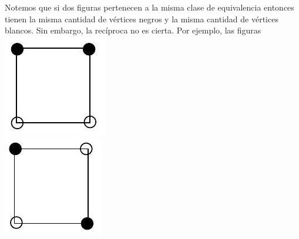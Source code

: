 \documentclass[10pt]{article}
\begin{document}
Notemos que si dos figuras pertenecen a la misma clase de equivalencia entonces tienen la misma cantidad de vértices negros y la misma cantidad de vértices blancos. Sin embargo, la recíproca no es cierta. Por ejemplo, las figuras\\
\includegraphics[max width=\textwidth, center]{2025_09_05_3ba26226ec0baddb5a03g-57(1)}\\
\includegraphics[max width=\textwidth, center]{2025_09_05_3ba26226ec0baddb5a03g-57}\\
\end{document}
